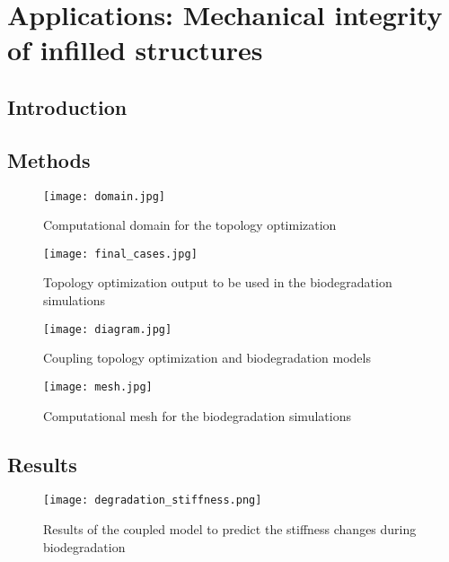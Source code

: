 \chapter{Applications: Mechanical integrity of infilled structures}\label{ch:infill}

\section{Introduction}

\section{Methods}

\begin{figure}[h]
\centering
\medskip
\texttt{[image: domain.jpg]}
\caption[Computational domain for the topology optimization]{Computational domain for the topology optimization} \label{fig:infill_domain}
\end{figure}


\begin{figure}[h]
\centering
\medskip
\texttt{[image: final\_cases.jpg]}
\caption[Topology optimization output to be used in the biodegradation simulations]{Topology optimization output to be used in the biodegradation simulations} \label{fig:infill_final_cases}
\end{figure}


\begin{figure}[h]
\centering
\medskip
\texttt{[image: diagram.jpg]}
\caption[Coupling topology optimization and biodegradation models]{Coupling topology optimization and biodegradation models} \label{fig:infill_diagram}
\end{figure}


\begin{figure}[h]
\centering
\medskip
\texttt{[image: mesh.jpg]}
\caption[Computational mesh for the biodegradation simulations]{Computational mesh for the biodegradation simulations} \label{fig:infill_mesh}
\end{figure}



\section{Results}


\begin{figure}[h]
\centering
\medskip
\texttt{[image: degradation\_stiffness.png]}
\caption[Results of the coupled model to predict the stiffness changes during biodegradation]{Results of the coupled model to predict the stiffness changes during biodegradation} \label{fig:infill_degradation_stiffness}
\end{figure}


